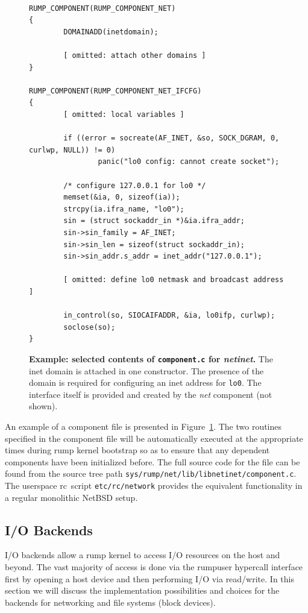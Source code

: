\begin{figure}
{\tt \scriptsize  
\begin{verbatim}
RUMP_COMPONENT(RUMP_COMPONENT_NET)
{
        DOMAINADD(inetdomain);

        [ omitted: attach other domains ]
}

RUMP_COMPONENT(RUMP_COMPONENT_NET_IFCFG)
{
        [ omitted: local variables ]

        if ((error = socreate(AF_INET, &so, SOCK_DGRAM, 0, curlwp, NULL)) != 0)
                panic("lo0 config: cannot create socket");

        /* configure 127.0.0.1 for lo0 */
        memset(&ia, 0, sizeof(ia));
        strcpy(ia.ifra_name, "lo0");
        sin = (struct sockaddr_in *)&ia.ifra_addr;
        sin->sin_family = AF_INET;
        sin->sin_len = sizeof(struct sockaddr_in);
        sin->sin_addr.s_addr = inet_addr("127.0.0.1");

        [ omitted: define lo0 netmask and broadcast address ]

        in_control(so, SIOCAIFADDR, &ia, lo0ifp, curlwp);
        soclose(so);
}
\end{verbatim}}
\caption[Example: selected contents of \texttt{component.c} for \textit{netinet}]{
\textbf{Example: selected contents of \texttt{component.c} for
\textit{netinet}.} The inet domain is attached in one constructor.
The presence of the domain is required for configuring an inet address
for \texttt{lo0}.  The interface itself is provided and created by the
\textit{net} component (not shown).
}
\label{fig:component.c}
\end{figure}

An example of a component file is presented in
Figure~\ref{fig:component.c}.  The two routines specified in the
component file will be automatically executed at the appropriate
times during rump kernel bootstrap so as to ensure that any
dependent components have been initialized before.  The full source
code for the file can be found from the source tree path
\texttt{sys/rump/net/lib/libnetinet/component.c}.  The
userspace rc~script \texttt{etc/rc/network} provides the equivalent
functionality in a regular monolithic NetBSD setup.


\subsection{I/O Backends}
\label{sect:iobackend}

I/O backends allow a rump kernel to access I/O resources on the host
and beyond.  The vast majority of access is done via the rumpuser
hypercall interface first by opening a host device and then performing
I/O via read/write.  In this section we will discuss the implementation
possibilities and choices for the backends for networking and 
file systems (block devices).

